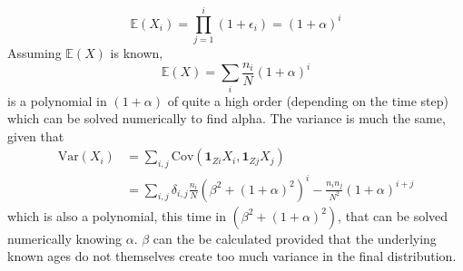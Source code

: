 \documentclass[a4paper,10pt]{article}
\begin{document}
\begin{equation}
 \mathbb{E}(X_i) = \prod_{j = 1}^i(1 + \epsilon_i) = (1 + \alpha)^i
\end{equation}
Assuming $\mathbb{E}(X)$ is known,
\begin{equation}
 \mathbb{E}(X) =\sum_i\frac{n_i}{N}(1 + \alpha)^i
\end{equation}
is a polynomial in $(1 + \alpha)$ of quite a high order (depending on the time step) which can be solved numerically to find alpha.
The variance is much the same, given that 
\begin{align}
 \mathrm{Var}(X_i) &= \sum_{i,j}\mathrm{Cov}(\mathbf{1}_{Zi}X_i,\mathbf{1}_{Zj}X_j) \\&= \sum_{i,j} \delta_{i,j}\frac{n_i}{N}(\beta^2 + (1+\alpha)^2)^i - \frac{n_in_j}{N^2}(1 + \alpha)^{i + j}
\end{align}
which is also a polynomial, this time in $(\beta^2 + (1+\alpha)^2)$, that can be solved numerically knowing $\alpha$. $\beta$ can the be calculated provided that the underlying known ages do not themselves create too much variance in the final distribution.
\end{document}
